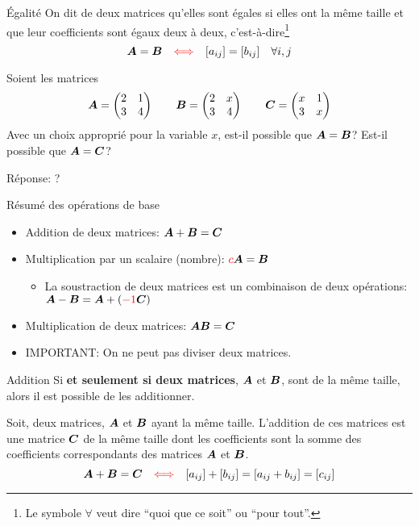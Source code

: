 \documentclass[french]{beamer}
\begin{document}
\begin{frame}{Égalité}
On dit de deux matrices qu'elles sont égales si elles ont la même taille
et que leur coefficients sont égaux deux à deux, c'est-à-dire\footnote{Le symbole $\forall$ veut dire 
``quoi que ce soit'' ou ``pour tout''.}
\[
\boldsymbol{A} = \boldsymbol{B} \quad {\color{red}\Longleftrightarrow} \quad [a_{ij}] = [b_{ij}]  \quad \forall i, j
\]

\begin{example}
Soient les matrices
    \[
    \boldsymbol{A} = \begin{pmatrix}
        2 & 1 \\
        3 & 4
        \end{pmatrix}
    \qquad
    \boldsymbol{B} = \begin{pmatrix}
        2 & x \\
        3 & 4
        \end{pmatrix}
        \qquad
    \boldsymbol{C} = \begin{pmatrix}
        x & 1 \\
        3 & x
        \end{pmatrix}
    \]
Avec un choix approprié pour la variable $x$, est-il possible que $\boldsymbol{A} =\boldsymbol{B}$?
Est-il possible que $\boldsymbol{A} = \boldsymbol{C}$?
\end{example}
Réponse: ?
\end{frame}		
		
	\begin{frame}{Résumé des opérations de base}
\begin{itemize}
	\item Addition de deux matrices: $\boldsymbol{A} + \boldsymbol{B} = \boldsymbol{C}$
	\item Multiplication par un scalaire (nombre): ${\color{red}c}\boldsymbol{A} = \boldsymbol{B}$
	\begin{itemize}
		\item La soustraction de deux matrices est un combinaison de
		deux opérations:  $\boldsymbol{A} - \boldsymbol{B} = \boldsymbol{A} + ({\color{red}-1}\boldsymbol{C})$
	\end{itemize}
	\item Multiplication de deux matrices: $\boldsymbol{A}\boldsymbol{B} = \boldsymbol{C}$
	\item IMPORTANT: On ne peut pas diviser deux matrices.
\end{itemize}
\end{frame}

\begin{frame}{Addition}
Si \textbf{et seulement si deux matrices}, $\boldsymbol{A}$ et $\boldsymbol{B}$, sont de la même taille, alors il est possible
de les additionner.  
\begin{definition}
Soit, deux matrices, $\boldsymbol{A}$ et $\boldsymbol{B}$ ayant la même taille.  L'addition de
ces matrices est une matrice $\boldsymbol{C}$ de la même taille dont les coefficients sont
la somme des coefficients correspondants des matrices $\boldsymbol{A}$ et $\boldsymbol{B}$.
\[
\boldsymbol{A} + \boldsymbol{B} = \boldsymbol{C} \quad {\color{red}\Longleftrightarrow} \quad [a_{ij}] + [b_{ij}] = [a_{ij} + b_{ij}] = [c_{ij}]
\]
\end{definition}
\end{frame}
\end{document}
